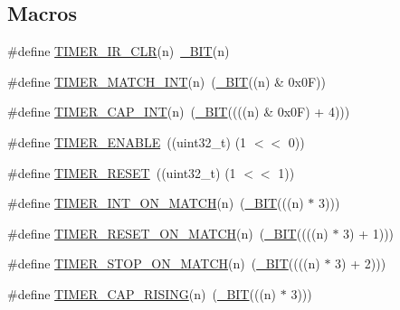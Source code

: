 \subsection*{Macros}
\begin{DoxyCompactItemize}
\item 
\#define \hyperlink{group__TIMER__17XX__40XX_ga7c74d9b89f53a497dd1128e2f4b2670b}{T\-I\-M\-E\-R\-\_\-\-I\-R\-\_\-\-C\-L\-R}(n)~\hyperlink{group__LPC__Types__Public__Macros_ga7ee022f5e5a971a8324e4b7572d49170}{\-\_\-\-B\-I\-T}(n)
\item 
\#define \hyperlink{group__TIMER__17XX__40XX_ga1f2ad401455a401aa8400fd343eadd1a}{T\-I\-M\-E\-R\-\_\-\-M\-A\-T\-C\-H\-\_\-\-I\-N\-T}(n)~(\hyperlink{group__LPC__Types__Public__Macros_ga7ee022f5e5a971a8324e4b7572d49170}{\-\_\-\-B\-I\-T}((n) \& 0x0\-F))
\item 
\#define \hyperlink{group__TIMER__17XX__40XX_ga085de5b6eb6d51b2ef555bd06f267f83}{T\-I\-M\-E\-R\-\_\-\-C\-A\-P\-\_\-\-I\-N\-T}(n)~(\hyperlink{group__LPC__Types__Public__Macros_ga7ee022f5e5a971a8324e4b7572d49170}{\-\_\-\-B\-I\-T}((((n) \& 0x0\-F) + 4)))
\item 
\#define \hyperlink{group__TIMER__17XX__40XX_gace9bc6168bdb15fd3c88da899ad3f154}{T\-I\-M\-E\-R\-\_\-\-E\-N\-A\-B\-L\-E}~((uint32\-\_\-t) (1 $<$$<$ 0))
\item 
\#define \hyperlink{group__TIMER__17XX__40XX_ga892a0fbd1ea794e5c6dbbc66e9703bd6}{T\-I\-M\-E\-R\-\_\-\-R\-E\-S\-E\-T}~((uint32\-\_\-t) (1 $<$$<$ 1))
\item 
\#define \hyperlink{group__TIMER__17XX__40XX_ga7fd49e94768d8d2016f72965f904f5e1}{T\-I\-M\-E\-R\-\_\-\-I\-N\-T\-\_\-\-O\-N\-\_\-\-M\-A\-T\-C\-H}(n)~(\hyperlink{group__LPC__Types__Public__Macros_ga7ee022f5e5a971a8324e4b7572d49170}{\-\_\-\-B\-I\-T}(((n) $\ast$ 3)))
\item 
\#define \hyperlink{group__TIMER__17XX__40XX_ga0d69103df0ceea6cb41286bc8e7536b3}{T\-I\-M\-E\-R\-\_\-\-R\-E\-S\-E\-T\-\_\-\-O\-N\-\_\-\-M\-A\-T\-C\-H}(n)~(\hyperlink{group__LPC__Types__Public__Macros_ga7ee022f5e5a971a8324e4b7572d49170}{\-\_\-\-B\-I\-T}((((n) $\ast$ 3) + 1)))
\item 
\#define \hyperlink{group__TIMER__17XX__40XX_ga7362986ae8e43df0e575eba1789722f4}{T\-I\-M\-E\-R\-\_\-\-S\-T\-O\-P\-\_\-\-O\-N\-\_\-\-M\-A\-T\-C\-H}(n)~(\hyperlink{group__LPC__Types__Public__Macros_ga7ee022f5e5a971a8324e4b7572d49170}{\-\_\-\-B\-I\-T}((((n) $\ast$ 3) + 2)))
\item 
\#define \hyperlink{group__TIMER__17XX__40XX_ga34ab45ae29494cf8f92fdc4e6eb7bb06}{T\-I\-M\-E\-R\-\_\-\-C\-A\-P\-\_\-\-R\-I\-S\-I\-N\-G}(n)~(\hyperlink{group__LPC__Types__Public__Macros_ga7ee022f5e5a971a8324e4b7572d49170}{\-\_\-\-B\-I\-T}(((n) $\ast$ 3)))

\end{DoxyCompactItemize}
